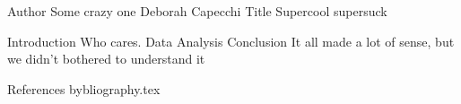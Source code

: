Author 	Some crazy one Deborah Capecchi
Title	Supercool supersuck


Introduction Who cares.
Data
Analysis
Conclusion
It all made a lot of sense, but we didn't bothered to understand it

References
bybliography.tex
